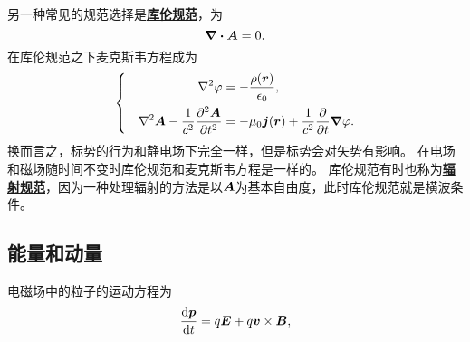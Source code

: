 \documentclass[UTF8, a4paper]{ctexart}
\newcommand*{\concept}[1]{\underline{\textbf{#1}}}
\newenvironment{bigcase}{\left\{\quad\begin{aligned}}{\end{aligned}\right.}
\begin{document}
另一种常见的规范选择是\concept{库伦规范}，为
\begin{equation}
    \div{\vb*{A}} = 0.
\end{equation}
在库伦规范之下麦克斯韦方程成为
\begin{equation}
    \begin{bigcase}
        \laplacian{\varphi} &= - \frac{\rho(\vb*{r})}{\epsilon_0}, \\
        \laplacian{\vb*{A}} - \frac{1}{c^2} \pdv[2]{\vb*{A}}{t} &= - \mu_0 \vb*{j}(\vb*{r}) + \frac{1}{c^2} \pdv{t} \grad{\varphi}.
    \end{bigcase}
\end{equation}
换而言之，标势的行为和静电场下完全一样，但是标势会对矢势有影响。
在电场和磁场随时间不变时库伦规范和麦克斯韦方程是一样的。
库伦规范有时也称为\concept{辐射规范}，因为一种处理辐射的方法是以$\vb*{A}$为基本自由度，此时库伦规范就是横波条件。

\subsection{能量和动量}

电磁场中的粒子的运动方程为
\begin{equation}
    \dv{\vb*{p}}{t} = q \vb*{E} + q \vb*{v} \times \vb*{B},
\end{equation}
\end{document}
